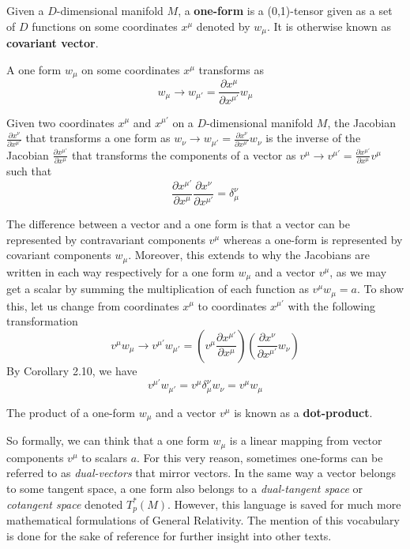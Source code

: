 \documentclass{article}
\begin{document}
 			\begin{defn}
 				Given a $D$-dimensional manifold $M$, a \textbf{one-form} is a (0,1)-tensor given as a set of $D$ functions on some coordinates $x^\mu$ denoted by $w_\mu$. It is otherwise known as \textbf{covariant vector}.
 			\end{defn}
 			\begin{thm}
 				A one form $w_\mu$ on some coordinates $x^\mu$ transforms as
 				$$ w_\mu \to w_{\mu'} = \frac{\partial x^\mu}{\partial x^{\mu'}} w_\mu$$
 			\end{thm}
 			\begin{cor}
 				Given two coordinates $x^\mu$ and $x^{\mu'}$ on a $D$-dimensional manifold $M$, the Jacobian $\frac{\partial x^\nu}{\partial x^{\mu'}}$ that transforms a one form as $w_\nu \to w_{\mu'} = \frac{\partial x^\nu}{\partial x^{\mu'}} w_\nu$ is the inverse of the Jacobian $\frac{\partial x^{\mu'}}{\partial x^\mu}$ that transforms the components of a vector as $v^\mu \to v^{\mu'} = \frac{\partial x^{\mu'}}{\partial x^\mu} v^\mu$ such that
 				$$ \frac{\partial x^{\mu'}}{\partial x^\mu}\frac{\partial x^\nu}{\partial x^{\mu'}} = \delta_{\mu}^\nu$$
 			\end{cor}\noindent
 			The difference between a vector and a one form is that a vector can be represented by contravariant components $v^\mu$ whereas a one-form is represented by covariant components $w_\mu$. Moreover, this extends to why the Jacobians are written in each way respectively for a one form $w_\mu$ and a vector $v^\mu$, as we may get a scalar by summing the multiplication of each function as $v^\mu w_\mu = a$. To show this, let us change from coordinates $x^\mu$ to coordinates $x^{\mu'}$ with the following transformation
 			$$ v^\mu w_\mu \to v^{\mu'} w_{\mu'} = \left( v^\mu \frac{\partial x^{\mu'}}{\partial x^\mu}  \right) \left(\frac{\partial x^\nu}{\partial x^{\mu'}} w_\nu \right)$$
 			By Corollary 2.10, we have
 			$$  v^{\mu'} w_{\mu'} = v^\mu \delta_\mu^\nu w_\nu = v^\mu w_\mu$$
 			\begin{defn}
 				The product of a one-form $w_\mu$ and a vector $v^\mu$ is known as a \textbf{dot-product}.
 			\end{defn}
 			
 			So formally, we can think that a one form $w_\mu$ is a linear mapping from vector components $v^\mu$ to scalars $a$. For this very reason, sometimes one-forms can be referred to as \textit{dual-vectors} that mirror vectors. In the same way a vector belongs to some tangent space, a one form also belongs to a \textit{dual-tangent space} or \textit{cotangent space} denoted $T_{p}^*(M)$. However, this language is saved for much more mathematical formulations of General Relativity. The mention of this vocabulary is done for the sake of reference for further insight into other texts. 
 			
\end{document}

